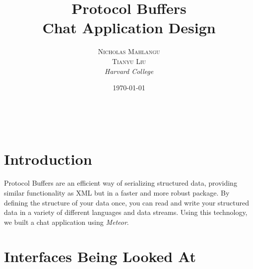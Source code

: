 \documentclass[a4paper, 11pt]{article} %
\title{\textbf{Protocol Buffers}\\ %
Chat Application Design} %
\author{\textsc{Nicholas Mahlangu} %
\\\textsc{Tianyu Liu}
\\{\textit{Harvard College}}} %
\date{\today} %
\makeatletter
\renewcommand{\maketitle}{ %
\begin{flushright} %
{\LARGE\@title} %

\vspace{50pt} %

{\large\@author} %
\\\@date %

\vspace{40pt} %
\end{flushright}
}
\makeatother
\begin{document}
\maketitle %



%
%


\section*{Introduction}

Protocol Buffers are an efficient way of serializing structured data, providing similar functionality as XML but in a faster and more robust package. By defining the structure of your data once, you can read and write your structured data in a variety of different languages and data streams. Using this technology, we built a chat application using \textit{Meteor}.

\section*{Interfaces Being Looked At}

\end{document}
